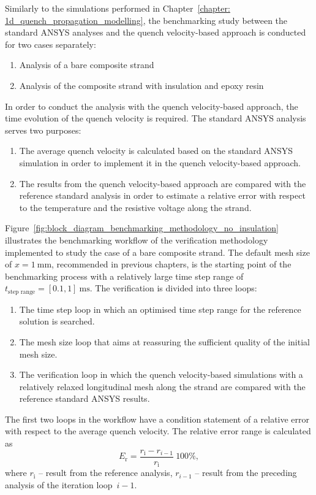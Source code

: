 
Similarly to the simulations performed in Chapter~\ref{chapter: 1d_quench_propagation_modelling}, the benchmarking study between the standard ANSYS analyses and the quench velocity-based approach is conducted for two cases separately: 
\begin{enumerate}
    \item Analysis of a bare composite strand
    \item Analysis of the composite strand with insulation and epoxy resin
\end{enumerate}

In order to conduct the analysis with the quench velocity-based approach, the time evolution of the quench velocity is required. The standard ANSYS analysis serves two purposes:
\begin{enumerate}
    \item The average quench velocity is calculated based on the standard ANSYS simulation in order to implement it in the quench velocity-based approach.
    \item The results from the quench velocity-based approach are  compared with the reference standard analysis in order to estimate a relative error with respect to the temperature and the resistive voltage along the strand.
\end{enumerate}

Figure~\ref{fig:block_diagram_benchmarking_methodology_no_insulation} illustrates the benchmarking workflow of the verification methodology implemented to study the case of a bare composite strand. The default mesh size of $x=1~\text{mm}$, recommended in previous chapters, is the starting point of the benchmarking process with a relatively large time step range of $t_\text{step range}= [0.1, 1]~\text{ms}$. The verification is divided into three loops: 
\begin{enumerate}
    \item The time step loop in which an optimised time step range for the reference solution is searched.
    \item The mesh size loop that aims at reassuring the sufficient quality of the initial mesh size. 
    \item The verification loop in which the quench velocity-based simulations with a relatively relaxed longitudinal mesh along the strand are compared with the reference standard ANSYS results.
\end{enumerate}

The first two loops in the workflow have a condition statement of a relative error with respect to the average quench velocity. The relative error range is calculated as 
\begin{equation}
    E_\text{r} = \frac{r_\text{i}-r_{i-1}}{r_\text{i}}~100\%,
    \label{eqn:condition_statement_relative_error_v_quench}
\end{equation}
where $r_\text{i}$ -- result from the reference analysis, $r_{i-1}$ -- result from the preceding analysis of the iteration loop~$i-1$.

